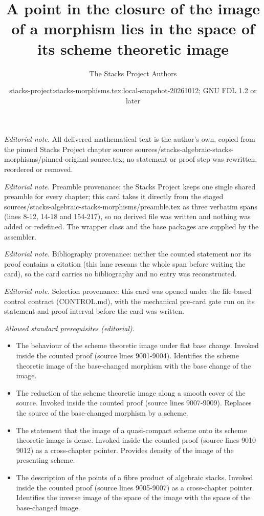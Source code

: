 \documentclass[10pt,a4paper]{amsart}
\title{A point in the closure of the image of a morphism lies in the space of its scheme theoretic image}
\author{The Stacks Project Authors}
\date{stacks-project:stacks-morphisms.tex:local-snapshot-20261012; GNU FDL 1.2 or later}
\theoremstyle{plain}
\theoremstyle{definition}
\theoremstyle{remark}
\numberwithin{equation}{subsection}
\begin{document}
\maketitle
\noindent\textit{Editorial note.} All delivered mathematical text is the author's own, copied from the pinned Stacks Project chapter source sources/stacks-algebraic-stacks-morphisms/pinned-original-source.tex; no statement or proof step was rewritten, reordered or removed.\par\medskip
\noindent\textit{Editorial note.} Preamble provenance: the Stacks Project keeps one single shared preamble for every chapter; this card takes it directly from the staged sources/stacks-algebraic-stacks-morphisms/preamble.tex as three verbatim spans (lines 8-12, 14-18 and 154-217), so no derived file was written and nothing was added or redefined. The wrapper class and the base packages are supplied by the assembler.\par\medskip
\noindent\textit{Editorial note.} Bibliography provenance: neither the counted statement nor its proof contains a citation (this lane rescans the whole span before writing the card), so the card carries no bibliography and no entry was reconstructed.\par\medskip
\noindent\textit{Editorial note.} Selection provenance: this card was opened under the file-based control contract (CONTROL.md), with the mechanical pre-card gate run on its statement and proof interval before the card was written.\par\medskip
\noindent\textit{Allowed standard prerequisites (editorial).}\begin{itemize}
\item The behaviour of the scheme theoretic image under flat base change. Invoked inside the counted proof (source lines 9001-9004). Identifies the scheme theoretic image of the base-changed morphism with the base change of the image.
\item The reduction of the scheme theoretic image along a smooth cover of the source. Invoked inside the counted proof (source lines 9007-9009). Replaces the source of the base-changed morphism by a scheme.
\item The statement that the image of a quasi-compact scheme onto its scheme theoretic image is dense. Invoked inside the counted proof (source lines 9010-9012) as a cross-chapter pointer. Provides density of the image of the presenting scheme.
\item The description of the points of a fibre product of algebraic stacks. Invoked inside the counted proof (source lines 9005-9007) as a cross-chapter pointer. Identifies the inverse image of the space of the image with the space of the base-changed image.
\end{itemize}\medskip
\end{document}
